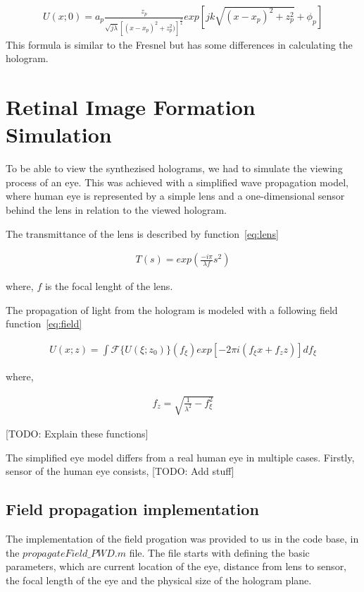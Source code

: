 \documentclass[12pt,a4paper,english
]{tunithesis}
\begin{document}
\begin{align}
  \label{eq:field}
  U(x;0) = a_p\frac{z_p}{\sqrt{j \lambda}[(x-x_p)^2+z_p^2)]^\frac{3}{4}}exp[jk\sqrt{(x-x_p)^2+z_p^2}+\phi_p]
\end{align}
This formula is similar to the Fresnel but has some differences in calculating the hologram. 

\section{Retinal Image Formation Simulation}
To be able to view the synthezised holograms, we had to simulate the viewing process of an eye. This was achieved with a simplified wave propagation model, where human eye is represented by a simple lens and a one-dimensional sensor behind the lens in relation to the viewed hologram.

The transmittance of the lens is described by function~\ref{eq:lens}

\begin{align}
  \label{eq:lens}
  T(s) = exp(\frac{-i\pi}{\lambda f}s^2)
\end{align}

where, $f$ is the focal lenght of the lens.

The propagation of light from the hologram is modeled with a following field function~\ref{eq:field}

\begin{align}
  \label{eq:field}
  U(x;z) = \int \mathscr{F} \{U (\xi;z_0) \} (f_\xi) exp[-2 \pi i (f_\xi x + f_z z)] d f_\xi
\end{align}

where,

\begin{align}
  \label{eq:focus}
  f_z = \sqrt{\frac{1}{\lambda^2} - f_\xi ^ 2}
\end{align}

[TODO: Explain these functions]

The simplified eye model differs from a real human eye in multiple cases. Firstly, sensor of the human eye consists, [TODO: Add stuff]

\subsection{Field propagation implementation}
The implementation of the field progation was provided to us in the code base, in the $propagateField\_PWD.m$ file. The file starts with defining the basic parameters, which are current location of the eye, distance from lens to sensor, the focal length of the eye and the physical size of the hologram plane.
\end{document}
